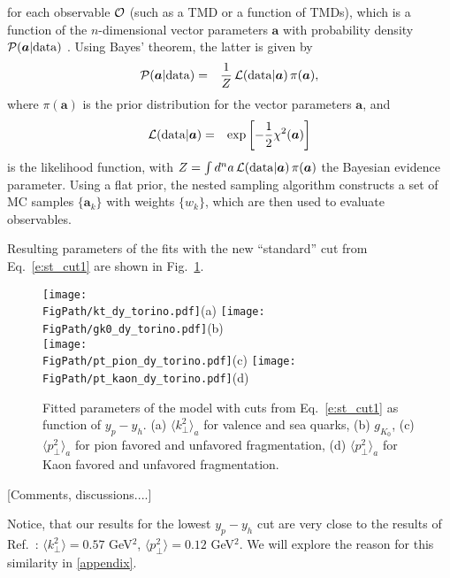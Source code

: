 \documentclass[final,3p,times,onecolumn,sort&compress,hidelinks]{elsarticle}
\newcommand*{\FigPath}{../Figs/}%
\begin{document}
%
for each observable ${\cal O}$ (such as a TMD or a function of TMDs),
which is a function of the $n$-dimensional vector parameters ${\bm a}$
with probability density ${\cal P}({\bm a}|{\rm data})$
\cite{Sato:2016wqj}.
Using Bayes' theorem, the latter is given by
%
\begin{eqnarray}
{\cal P}({\bm a}|{\rm data})
&=& \frac{1}{Z}\, {\cal L}({\rm data}|{\bm a})\, \pi({\bm a}),
\end{eqnarray}
%
where $\pi({\bm a})$ is the prior distribution for the vector
parameters ${\bm a}$, and
%
\begin{eqnarray}
{\cal L}({\rm data}|{\bm a})
&=& \exp\left[ -\frac12 \chi^2({\bm a}) \right]
\end{eqnarray}
%
is the likelihood function, with
  $Z = \int d^n a\, {\cal L}({\rm data}|{\bm a})\, \pi({\bm a})$
the Bayesian evidence parameter.
%
Using a flat prior, the nested sampling algorithm constructs a set
of MC samples $\{\bm a_k\}$ with weights $\{w_k\}$, which are then
used to evaluate observables.



Resulting parameters of the fits with  the  new ``standard'' cut from Eq.~\eqref{e:st_cut1} 
are shown in Fig.~\ref{Fig:torino}.

\begin{figure}[htb!]
\centering
\texttt{[image: \\FigPath/kt\_dy\_torino.pdf]}{\tiny(a)}%
\texttt{[image: \\FigPath/gk0\_dy\_torino.pdf]}{\tiny(b)}\\%
\texttt{[image: \\FigPath/pt\_pion\_dy\_torino.pdf]}{\tiny(c)}%
\texttt{[image: \\FigPath/pt\_kaon\_dy\_torino.pdf]}{\tiny(d)}%
\caption{\label{Fig:torino}
Fitted parameters of the model with cuts from Eq.~\eqref{e:st_cut1} as function of $y_p-y_h$. (a) $\langle k_\perp^2 \rangle_a$ for valence and sea quarks,
(b) $g_{K_0}$,
(c) $\langle p_\perp^2 \rangle_a$ for pion favored and unfavored fragmentation, (d) $\langle p_\perp^2 \rangle_a$ for Kaon favored and unfavored fragmentation.
}
\end{figure}

[Comments, discussions....]

Notice, that our results for the lowest $y_p-y_h$ cut are very close to the results of Ref.~\cite{Anselmino:2013lza}: 
$ \langle k_\perp^2 \rangle = 0.57$ GeV$^2$, $ \langle p_\perp^2 \rangle = 0.12$ GeV$^2$. We will explore the reason for this similarity in \ref{appendix}.
\end{document}
